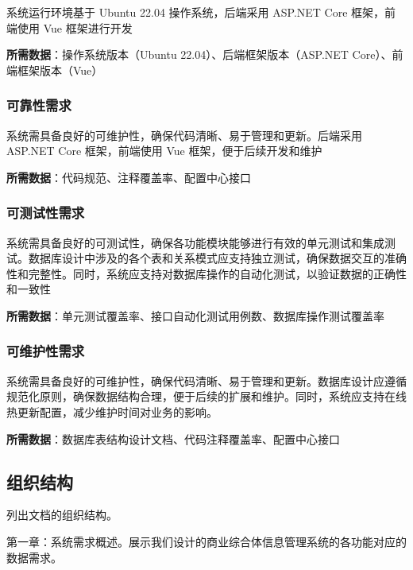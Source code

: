 \documentclass[]{article}
\begin{document}
系统运行环境基于 Ubuntu 22.04 操作系统，后端采用 ASP.NET Core
框架，前端使用 Vue 框架进行开发

\textbf{所需数据}：操作系统版本（Ubuntu 22.04）、后端框架版本（ASP.NET
Core）、前端框架版本（Vue）

\hypertarget{ux53efux9760ux6027ux9700ux6c42-1}{%
\subsubsection{可靠性需求}\label{ux53efux9760ux6027ux9700ux6c42-1}}

系统需具备良好的可维护性，确保代码清晰、易于管理和更新。后端采用 ASP.NET
Core 框架，前端使用 Vue 框架，便于后续开发和维护

\textbf{所需数据}：代码规范、注释覆盖率、配置中心接口

\hypertarget{ux53efux6d4bux8bd5ux6027ux9700ux6c42}{%
\subsubsection{可测试性需求}\label{ux53efux6d4bux8bd5ux6027ux9700ux6c42}}

系统需具备良好的可测试性，确保各功能模块能够进行有效的单元测试和集成测试。数据库设计中涉及的各个表和关系模式应支持独立测试，确保数据交互的准确性和完整性。同时，系统应支持对数据库操作的自动化测试，以验证数据的正确性和一致性

\textbf{所需数据}：单元测试覆盖率、接口自动化测试用例数、数据库操作测试覆盖率

\hypertarget{ux53efux7ef4ux62a4ux6027ux9700ux6c42}{%
\subsubsection{可维护性需求}\label{ux53efux7ef4ux62a4ux6027ux9700ux6c42}}

系统需具备良好的可维护性，确保代码清晰、易于管理和更新。数据库设计应遵循规范化原则，确保数据结构合理，便于后续的扩展和维护。同时，系统应支持在线热更新配置，减少维护时间对业务的影响。

\textbf{所需数据}：数据库表结构设计文档、代码注释覆盖率、配置中心接口

\hypertarget{ux7ec4ux7ec7ux7ed3ux6784}{%
\subsection{组织结构}\label{ux7ec4ux7ec7ux7ed3ux6784}}

列出文档的组织结构。

第一章：系统需求概述。展示我们设计的商业综合体信息管理系统的各功能对应的数据需求。
\end{document}
